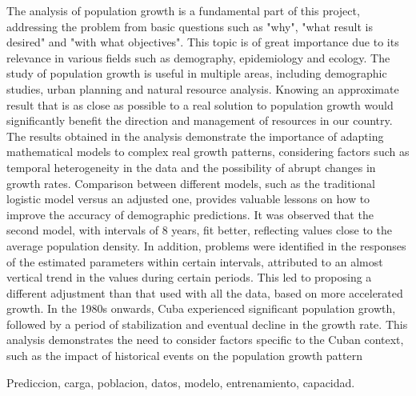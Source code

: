 \documentclass[a4paper,10pt,twocolumn]{article}
\begin{document}
\vspace{0.5cm}

\begin{enabstract}

	The analysis of population growth is a fundamental part of this project, addressing the problem from basic questions such as "why", "what result is desired" and "with what objectives".
	This topic is of great importance due to its relevance in various fields such as demography, epidemiology and ecology. The study of population growth is useful in multiple areas, including demographic studies, urban planning and natural resource analysis. Knowing an approximate result that is as close as possible to a real solution to population growth would significantly benefit the direction and management of resources in our country. The results obtained in the analysis demonstrate the importance of adapting mathematical models to complex real growth patterns, considering factors such as temporal heterogeneity in the data and the possibility of abrupt changes in growth rates. Comparison between different models, such as the traditional logistic model versus an adjusted one, provides valuable lessons on how to improve the accuracy of demographic predictions. It was observed that the second model, with intervals of 8 years, fit better, reflecting values ​​close to the average population density. In addition, problems were identified in the responses of the estimated parameters within certain intervals, attributed to an almost vertical trend in the values ​​during certain periods. This led to proposing a different adjustment than that used with all the data, based on more accelerated growth. In the 1980s onwards, Cuba experienced significant population growth, followed by a period of stabilization and eventual decline in the growth rate. This analysis demonstrates the need to consider factors specific to the Cuban context, such as the impact of historical events on the population growth pattern
\end{enabstract}

\begin{keywords}
	Prediccion,
	carga,
	poblacion,
	datos,
	modelo,
	entrenamiento,
	capacidad.
\end{keywords}
\end{document}

